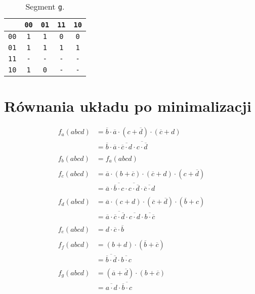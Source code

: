 \documentclass[10pt,a4paper]{article}
\newcommand{\f}[1]{\texttt{#1}}
\newcommand{\ol}[1]{\overline{#1}}
\begin{document}
\begin{table}[!ht]
  \centering
  \begin{minipage}{0.3\linewidth}
    \centering
    \begin{tabular}{c|cccc}
             & \f{00} & \f{01} & \f{11} & \f{10} \\
      \midrule
      \f{00} &  \f{1} &  \f{1} &  \f{0} &  \f{0} \\
      \f{01} &  \f{1} &  \f{1} &  \f{1} &  \f{1} \\
      \f{11} &  \f{-} &  \f{-} &  \f{-} &  \f{-} \\
      \f{10} &  \f{1} &  \f{0} &  \f{-} &  \f{-} \\
    \end{tabular}
    \caption{Segment \f{g}.}
  \end{minipage}
\end{table}
\pagebreak



\section*{Równania układu po minimalizacji}

\begin{align*}
  f_a(abcd) &= \ol{b} \cdot \ol{a} \cdot (c + \ol{d}) \cdot (\ol{c} + d) \\
            &= \ol{b} \cdot \ol{a} \cdot \ol{\ol{c} \cdot d} \cdot \ol{c \cdot \ol{d}} \\
  & \\
  f_b(abcd) &= f_a(abcd) \\
  & \\
  f_c(abcd) &= \ol{a} \cdot (b + \ol{c}) \cdot (\ol{c} + d) \cdot (c + \ol{d}) \\
            &= \ol{a} \cdot \ol{\ol{b} \cdot c} \cdot \ol{c \cdot \ol{d}} \cdot \ol{\ol{c} \cdot d} \\
  & \\
  f_d(abcd) &= \ol{a} \cdot (c + d) \cdot (\ol{c} + \ol{d}) \cdot (\ol{b} + c) \\
            &= \ol{a} \cdot \ol{\ol{c} \cdot \ol{d}} \cdot \ol{c \cdot d} \cdot \ol{b \cdot \ol{c}} \\
  & \\
  f_e(abcd) &= d \cdot \ol{c} \cdot \ol{b} \\
  & \\
  f_f(abcd) &= (b + d) \cdot (\ol{b} + \ol{c}) \\
            &= \ol{\ol{b} \cdot \ol{d}} \cdot \ol{b \cdot c} \\
  & \\
  f_g(abcd) &= (\ol{a} + \ol{d}) \cdot (b + \ol{c}) \\
            &= \ol{a \cdot d} \cdot \ol{\ol{b} \cdot c} \\
\end{align*}
\end{document}
